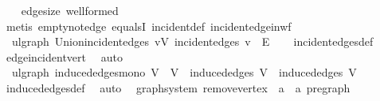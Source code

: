\begin{isabellebody}
%
\isadelimproof
\ \ %
\endisadelimproof
%
\isatagproof
{}\isamarkupfalse%
\ edge{\isacharunderscore}{\kern0pt}size\ wellformed\ \isamarkupfalse%
\ {\isacharparenleft}{\kern0pt}metis\ empty{\isacharunderscore}{\kern0pt}not{\isacharunderscore}{\kern0pt}edge\ equals{}I\ incident{\isacharunderscore}{\kern0pt}def\ incident{\isacharunderscore}{\kern0pt}edge{\isacharunderscore}{\kern0pt}in{\isacharunderscore}{\kern0pt}wf{\isacharparenright}{\kern0pt}%
\endisatagproof
{\isafoldproof}%
%
\isadelimproof
\isanewline
%
\endisadelimproof
\isanewline
{}\isamarkupfalse%
\ {\isacharparenleft}{\kern0pt}\ ulgraph{\isacharparenright}{\kern0pt}\ Union{\isacharunderscore}{\kern0pt}incident{\isacharunderscore}{\kern0pt}edges{\isacharcolon}{\kern0pt}\ {\isachardoublequoteopen}{\isacharparenleft}{\kern0pt}{\isasymUnion}v{\isasymin}V{\isachardot}{\kern0pt}\ incident{\isacharunderscore}{\kern0pt}edges\ v{\isacharparenright}{\kern0pt}\ {\isacharequal}{\kern0pt}\ E{\isachardoublequoteclose}\isanewline
%
\isadelimproof
\ \ %
\endisadelimproof
%
\isatagproof
{}\isamarkupfalse%
\ incident{\isacharunderscore}{\kern0pt}edges{\isacharunderscore}{\kern0pt}def\ \isamarkupfalse%
\ edge{\isacharunderscore}{\kern0pt}incident{\isacharunderscore}{\kern0pt}vert\ \isamarkupfalse%
\ auto%
\endisatagproof
{\isafoldproof}%
%
\isadelimproof
\isanewline
%
\endisadelimproof
\isanewline
\isanewline
{}\isamarkupfalse%
\ {\isacharparenleft}{\kern0pt}\ ulgraph{\isacharparenright}{\kern0pt}\ induced{\isacharunderscore}{\kern0pt}edges{\isacharunderscore}{\kern0pt}mono{\isacharcolon}{\kern0pt}\ {\isachardoublequoteopen}V\ {\isasymsubseteq}\ V\ {\isasymLongrightarrow}\ induced{\isacharunderscore}{\kern0pt}edges\ V\ {\isasymsubseteq}\ induced{\isacharunderscore}{\kern0pt}edges\ V\isanewline
%
\isadelimproof
\ \ %
\endisadelimproof
%
\isatagproof
{}\isamarkupfalse%
\ induced{\isacharunderscore}{\kern0pt}edges{\isacharunderscore}{\kern0pt}def\ \isamarkupfalse%
\ auto%
\endisatagproof
{\isafoldproof}%
%
\isadelimproof
\isanewline
%
\endisadelimproof
\isanewline
{}\isamarkupfalse%
\ {\isacharparenleft}{\kern0pt}\ graph{\isacharunderscore}{\kern0pt}system{\isacharparenright}{\kern0pt}\ remove{\isacharunderscore}{\kern0pt}vertex\ {\isacharcolon}{\kern0pt}{\isacharcolon}{\kern0pt}\ {\isachardoublequoteopen}{\isacharprime}{\kern0pt}a\ {\isasymRightarrow}\ {\isacharprime}{\kern0pt}a\ pregraph{\isachardoublequoteclose}\ \isanewline

\end{isabellebody}
